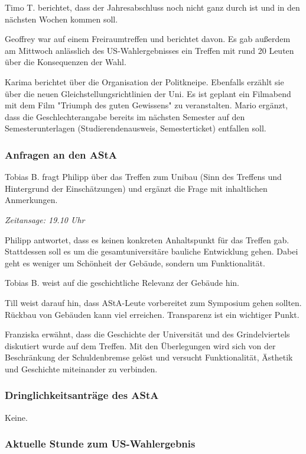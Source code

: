 \documentclass[ngerman,headheight=70pt]{scrartcl}
\begin{document}
    Timo T. berichtet, dass der Jahresabschluss noch nicht ganz durch ist
    und in den nächsten Wochen kommen soll.

    Geoffrey war auf einem Freiraumtreffen und berichtet davon. Es gab außerdem
    am Mittwoch anlässlich des US-Wahlergebnisses ein Treffen mit rund 20 Leuten
    über die Konsequenzen der Wahl.

    Karima berichtet über die Organisation der Politkneipe. Ebenfalls erzählt sie
    über die neuen Gleichstellungsrichtlinien der Uni. Es ist geplant ein Filmabend
    mit dem Film "Triumph des guten Gewissens" zu veranstalten.
    Mario ergänzt, dass die Geschlechterangabe bereits im nächsten Semester auf
    den Semesterunterlagen (Studierendenausweis, Semesterticket) entfallen
    soll.

    \subsubsection{Anfragen an den AStA}

    Tobias B. fragt Philipp über das Treffen zum Unibau (Sinn des Treffens
    und Hintergrund der Einschätzungen) und ergänzt die Frage
    mit inhaltlichen Anmerkungen.

    \textit{Zeitansage: 19.10 Uhr}

    Philipp antwortet, dass es keinen konkreten Anhaltspunkt für das Treffen gab.
    Stattdessen soll es um die gesamtuniversitäre bauliche Entwicklung gehen.
    Dabei geht es weniger um Schönheit der Gebäude, sondern um Funktionalität.

    Tobias B. weist auf die geschichtliche Relevanz der Gebäude hin.

    Till weist darauf hin, dass AStA-Leute vorbereitet zum Symposium gehen sollten.
    Rückbau von Gebäuden kann viel erreichen. Transparenz ist ein wichtiger Punkt.

    Franziska erwähnt, dass die Geschichte der Universität und des Grindelviertels
    diskutiert wurde auf dem Treffen. Mit den Überlegungen wird sich von der
    Beschränkung der Schuldenbremse gelöst und versucht Funktionalität, Ästhetik
    und Geschichte miteinander zu verbinden.

    \subsubsection{Dringlichkeitsanträge des AStA}

    Keine.

    \subsubsection{Aktuelle Stunde zum US-Wahlergebnis}
\end{document}
